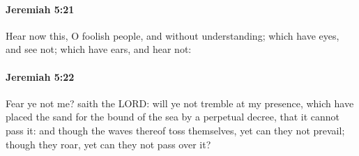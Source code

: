 		\paragraph{Jeremiah 5:21} %
			\label{JEREMIAH-5-21}

			Hear now this, O foolish people, and without understanding; which have eyes, and see not; which have ears, and hear not:


		\paragraph{Jeremiah 5:22} %
			\label{JEREMIAH-5-22}

			Fear ye not me? saith the LORD: will ye not tremble at my presence, which have placed the sand for the bound of the sea by a perpetual decree, that it cannot pass it: and though the waves thereof toss themselves, yet can they not prevail; though they roar, yet can they not pass over it?

